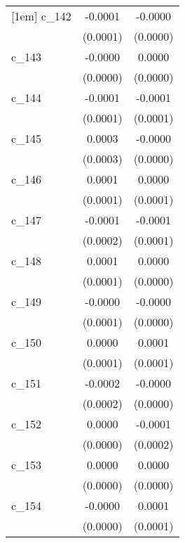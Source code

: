 {\begin{tabular}{l*{2}{c}}
[1em]
c\_142       &     -0.0001        &     -0.0000        \\
            &    (0.0001)        &    (0.0000)        \\
[1em]
c\_143       &     -0.0000        &      0.0000        \\
            &    (0.0000)        &    (0.0000)        \\
[1em]
c\_144       &     -0.0001        &     -0.0001        \\
            &    (0.0001)        &    (0.0001)        \\
[1em]
c\_145       &      0.0003        &     -0.0000        \\
            &    (0.0003)        &    (0.0000)        \\
[1em]
c\_146       &      0.0001        &      0.0000        \\
            &    (0.0001)        &    (0.0001)        \\
[1em]
c\_147       &     -0.0001        &     -0.0001        \\
            &    (0.0002)        &    (0.0001)        \\
[1em]
c\_148       &      0.0001        &      0.0000        \\
            &    (0.0001)        &    (0.0000)        \\
[1em]
c\_149       &     -0.0000        &     -0.0000        \\
            &    (0.0001)        &    (0.0000)        \\
[1em]
c\_150       &      0.0000        &      0.0001        \\
            &    (0.0001)        &    (0.0001)        \\
[1em]
c\_151       &     -0.0002        &     -0.0000        \\
            &    (0.0002)        &    (0.0000)        \\
[1em]
c\_152       &      0.0000        &     -0.0001        \\
            &    (0.0000)        &    (0.0002)        \\
[1em]
c\_153       &      0.0000        &      0.0000        \\
            &    (0.0000)        &    (0.0000)        \\
[1em]
c\_154       &     -0.0000        &      0.0001        \\
            &    (0.0000)        &    (0.0001)        \\

\end{tabular}}
